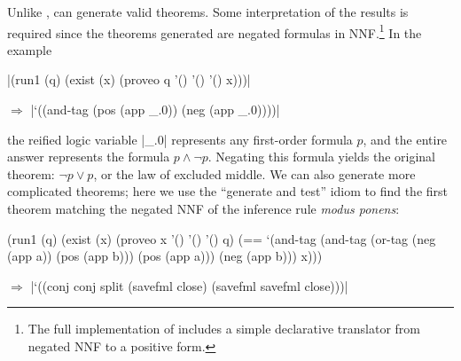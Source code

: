 




Unlike \leantap, \alphatapsp can generate valid theorems.  Some
interpretation of the results is required since the theorems generated
are negated formulas in NNF.\footnote{The full implementation of
  \alphatapsp includes a simple declarative translator from negated
  NNF to a positive form.}  In the example

\smallskip

\scheme|(run1 (q) (exist (x) (proveo q '() '() '() x)))|

\hspace{0.1cm}$\Rightarrow$
\schemeresult|`((and-tag (pos (app _.0)) (neg (app _.0))))|

\smallskip

\noindent 
the reified logic variable \schemeresult|_.0| represents any
first-order formula $p$, and the entire answer represents the formula
$p \wedge \neg p$.  Negating this formula yields the original theorem:
$\neg p \vee p$, or the law of excluded middle.  We can also generate
more complicated theorems; here we use the ``generate and test'' idiom
to find the first theorem matching the negated NNF of the inference
rule {\it modus ponens}:

\schemedisplayspace
\begin{schemedisplay}
(run1 (q)
  (exist (x)
    (proveo x '() '() '() q)
    (== `(and-tag (and-tag (or-tag (neg (app a)) (pos (app b))) (pos (app a))) (neg (app b)))
        x)))
\end{schemedisplay}
 \vspace{-.1cm}
\noindent $\Rightarrow$ \schemeresult|`((conj conj split (savefml close) (savefml savefml close)))|

